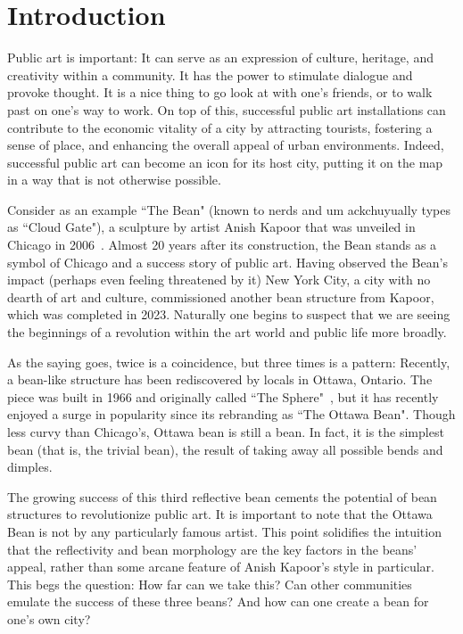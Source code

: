 \documentclass[%
reprint,
twocolumn,
nofootinbib,
 amsmath,amssymb,
 aps,
]{revtex4-2}
\begin{document}
\section{Introduction}

Public art is important: It can serve as an expression of culture, heritage, and creativity within a community. It has the power to stimulate dialogue and provoke thought. It is a nice thing to go look at with one's friends\footnotemark[4], or to walk past on one's way to work. On top of this, successful public art installations can contribute to the economic vitality of a city by attracting tourists, fostering a sense of place, and enhancing the overall appeal of urban environments. Indeed, successful public art can become an icon for its host city, putting it on the map in a way that is not otherwise possible. 

Consider as an example ``The Bean" (known to nerds and um ackchuyually types as ``Cloud Gate"), a sculpture by artist Anish Kapoor that was unveiled in Chicago in 2006~\cite{City}. Almost 20 years after its construction, the Bean stands as a symbol of Chicago and a success story of public art. Having observed the Bean's impact (perhaps even feeling threatened by it) New York City, a city with no dearth of art and culture, commissioned another bean structure from Kapoor, which was completed in 2023. Naturally one begins to suspect that we are seeing the beginnings of a revolution within the art world and public life more broadly.

As the saying goes, twice is a coincidence, but three times is a pattern: Recently, a bean-like structure has been rediscovered by locals in Ottawa, Ontario. The piece was built in 1966 and originally called ``The Sphere"~\cite{Waymarking}, but it has recently enjoyed a surge in popularity since its rebranding as ``The Ottawa Bean". Though less curvy than Chicago's, Ottawa bean is still a bean. In fact, it is the simplest bean (that is, the trivial bean), the result of taking away all possible bends and dimples.

The growing success of this third reflective bean cements the potential of bean structures to revolutionize public art. It is important to note that the Ottawa Bean is not by any particularly famous artist\footnotemark[2]. This point solidifies the intuition that the reflectivity and bean morphology are the key factors in the beans' appeal, rather than some arcane feature of Anish Kapoor's style in particular. This begs the question: How far can we take this? Can other communities emulate the success of these three beans? And how can one create a bean for one's own city?
\end{document}
